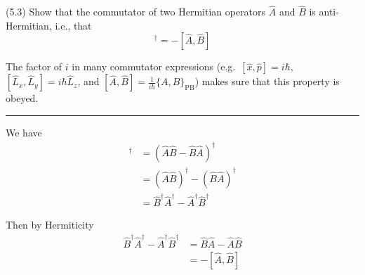 \documentclass[12pt]{article}
\begin{document}
(5.3)
Show that the commutator of two Hermitian operators
$\hat A$ and $\hat B$ is anti-Hermitian, i.e., that
\begin{equation*}
[\hat A,\hat B]^\dag=-[\hat A,\hat B]
\tag{5.61}
\end{equation*}

The factor of $i$ in many commutator expressions
(e.g.~$[\hat x,\hat p]=i\hbar$,
$[\hat L_x,\hat L_y]=i\hbar\hat L_z$, and
$[\hat A,\hat B]=\frac{1}{i\hbar}\{A,B\}_\mathrm{PB}$)
makes sure that this property is obeyed.

\bigskip
\hrule

\bigskip
We have
\begin{align*}
[\hat A,\hat B]^\dag
&=(\hat A\hat B-\hat B\hat A)^\dag
\\
&=(\hat A\hat B)^\dag-(\hat B\hat A)^\dag
\\
&=\hat B^\dag\hat A^\dag-\hat A^\dag\hat B^\dag
\end{align*}

Then by Hermiticity
\begin{align*}
\hat B^\dag\hat A^\dag-\hat A^\dag\hat B^\dag
&=\hat B\hat A-\hat A\hat B
\\
&=-[\hat A,\hat B]
\end{align*}
\end{document}
